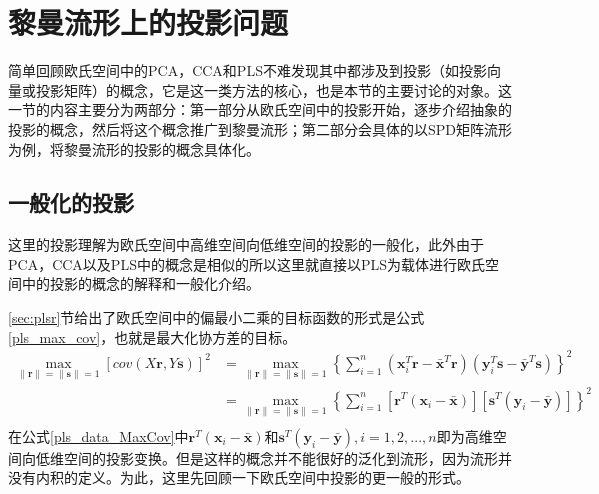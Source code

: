\section{黎曼流形上的投影问题}
\label{sec:manifold_projection}
简单回顾欧氏空间中的PCA，CCA和PLS不难发现其中都涉及到投影（如投影向量或投影矩阵）的概念，它是这一类方法的核心，也是本节的主要讨论的对象。这一节的内容主要分为两部分：第一部分从欧氏空间中的投影开始，逐步介绍抽象的投影的概念，然后将这个概念推广到黎曼流形；第二部分会具体的以SPD矩阵流形为例，将黎曼流形的投影的概念具体化。
\subsection{一般化的投影}
\label{sec:common_projection}
这里的投影理解为欧氏空间中高维空间向低维空间的投影的一般化，此外由于PCA，CCA以及PLS中的概念是相似的所以这里就直接以PLS为载体进行欧氏空间中的投影的概念的解释和一般化介绍。

\ref{sec:plsr}节给出了欧氏空间中的偏最小二乘的目标函数的形式是公式\ref{pls_max_cov}，也就是最大化协方差的目标。
\begin{equation}
\label{pls_data_MaxCov}
\begin{split}
\max_{\|\bm{r}\|=\|\bm{s}\|=1}[cov(X\bm{r},Y\bm{s})]^{2}&=\max_{\|\bm{r}\|=\|\bm{s}\|=1}\left\{\sum_{i=1}^{n}(\bm{x}_{i}^{T}\bm{r}-\bar{\bm{x}}^{T}\bm{r})(\bm{y}_{i}^{T}\bm{s}-\bar{\bm{y}}^{T}\bm{s})\right\}^2\\
&=\max_{\|\bm{r}\|=\|\bm{s}\|=1}\left\{\sum_{i=1}^{n}[\bm{r}^{T}(\bm{x}_{i}-\bar{\bm{x}})][\bm{s}^{T}(\bm{y}_{i}-\bar{\bm{y}})]\right\}^2\\
\end{split}
\end{equation}
在公式\ref{pls_data_MaxCov}中$\bm{r}^{T}(\bm{x}_{i}-\bar{\bm{x}})$和$\bm{s}^{T}(\bm{y}_{i}-\bar{\bm{y}}),i=1,2,...,n$即为高维空间向低维空间的投影变换。但是这样的概念并不能很好的泛化到流形，因为流形并没有内积的定义。为此，这里先回顾一下欧氏空间中投影的更一般的形式。


